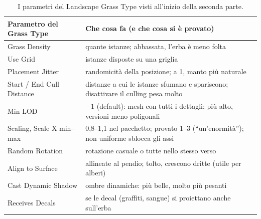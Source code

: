 \begin{table}[htbp]
\centering
\small
\begin{tabular}{@{}p{4.4cm}p{9.6cm}@{}}
\toprule
\textbf{Parametro del Grass Type} & \textbf{Che cosa fa (e che cosa si è provato)} \\
\midrule
Grass Density & quante istanze; abbassata, l'erba è meno folta \\
Use Grid & istanze disposte su una griglia \\
Placement Jitter & randomicità della posizione; a 1, manto più naturale \\
Start / End Cull Distance & distanze a cui le istanze sfumano e spariscono; disattivare il
culling pesa molto \\
Min LOD & $-1$ (default): mesh con tutti i dettagli; più alto, versioni meno poligonali \\
Scaling, Scale X min--max & 0,8--1,1 nel pacchetto; provato 1--3 (``un'enormità'');
non uniforme sblocca gli assi \\
Random Rotation & rotazione casuale o tutte nello stesso verso \\
Align to Surface & allineate al pendio; tolto, crescono dritte (utile per alberi) \\
Cast Dynamic Shadow & ombre dinamiche: più belle, molto più pesanti \\
Receives Decals & se le decal (graffiti, sangue) si proiettano anche sull'erba \\
\bottomrule
\end{tabular}
\caption{I parametri del Landscape Grass Type visti all'inizio della seconda parte.}
\label{ue15:tab:grasstype}
\end{table}

